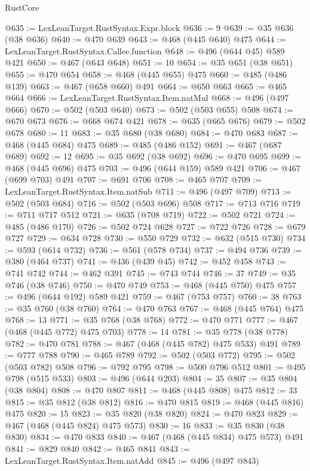 \begin{lexlean}{RustCore}
\begin{coremodule}
@635 := LexLeanTarget.RustSyntax.Expr.block
@636 := 9
@639 := @35 @636 (@38 @636)
@640 := @470 @639
@643 := @468 (@445 @640) @475
@644 := LexLeanTarget.RustSyntax.Callee.function
@648 := @496 (@644 @45) @589 @421
@650 := @467 (@643 @648)
@651 := 10
@654 := @35 @651 (@38 @651)
@655 := @470 @654
@658 := @468 (@445 @655) @475
@660 := @485 (@486 @139)
@663 := @467 (@658 @660) @491
@664 := @650 @663
@665 := @465 @664
@666 := LexLeanTarget.RustSyntax.Item.natMul
@668 := @496 (@497 @666)
@670 := @502 (@503 @640)
@673 := @502 (@503 @655) @508
@674 := @670 @673
@676 := @668 @674 @421
@678 := @635 (@665 @676)
@679 := @502 @678
@680 := 11
@683 := @35 @680 (@38 @680)
@684 := @470 @683
@687 := @468 (@445 @684) @475
@689 := @485 (@486 @152)
@691 := @467 (@687 @689)
@692 := 12
@695 := @35 @692 (@38 @692)
@696 := @470 @695
@699 := @468 (@445 @696) @475
@703 := @496 (@644 @159) @589 @421
@706 := @467 (@699 @703) @491
@707 := @691 @706
@708 := @465 @707
@709 := LexLeanTarget.RustSyntax.Item.natSub
@711 := @496 (@497 @709)
@713 := @502 (@503 @684)
@716 := @502 (@503 @696) @508
@717 := @713 @716
@719 := @711 @717 @512
@721 := @635 (@708 @719)
@722 := @502 @721
@724 := @485 (@486 @170)
@726 := @502 @724 @628
@727 := @722 @726
@728 := @679 @727
@729 := @634 @728
@730 := @550 @729
@732 := @632 (@515 @730)
@734 := @593 (@614 @732)
@736 := @561 (@578 @734)
@737 := @494 @736
@739 := @380 (@464 @737)
@741 := @436 (@439 @45)
@742 := @452 @458
@743 := @741 @742
@744 := @462 @391
@745 := @743 @744
@746 := 37
@749 := @35 @746 (@38 @746)
@750 := @470 @749
@753 := @468 (@445 @750) @475
@757 := @496 (@644 @192) @589 @421
@759 := @467 (@753 @757)
@760 := 38
@763 := @35 @760 (@38 @760)
@764 := @470 @763
@767 := @468 (@445 @764) @475
@768 := 13
@771 := @35 @768 (@38 @768)
@772 := @470 @771
@777 := @467 (@468 (@445 @772) @475 @703)
@778 := 14
@781 := @35 @778 (@38 @778)
@782 := @470 @781
@788 := @467 (@468 (@445 @782) @475 @533) @491
@789 := @777 @788
@790 := @465 @789
@792 := @502 (@503 @772)
@795 := @502 (@503 @782) @508
@796 := @792 @795
@798 := @500 @796 @512
@801 := @495 @798 (@515 @533)
@803 := @496 (@644 @203)
@804 := 35
@807 := @35 @804 (@38 @804)
@808 := @470 @807
@811 := @468 (@445 @808) @475
@812 := 33
@815 := @35 @812 (@38 @812)
@816 := @470 @815
@819 := @468 (@445 @816) @475
@820 := 15
@823 := @35 @820 (@38 @820)
@824 := @470 @823
@829 := @467 (@468 (@445 @824) @475 @573)
@830 := 16
@833 := @35 @830 (@38 @830)
@834 := @470 @833
@840 := @467 (@468 (@445 @834) @475 @573) @491
@841 := @829 @840
@842 := @465 @841
@843 := LexLeanTarget.RustSyntax.Item.natAdd
@845 := @496 (@497 @843)

\end{coremodule}
\end{lexlean}
